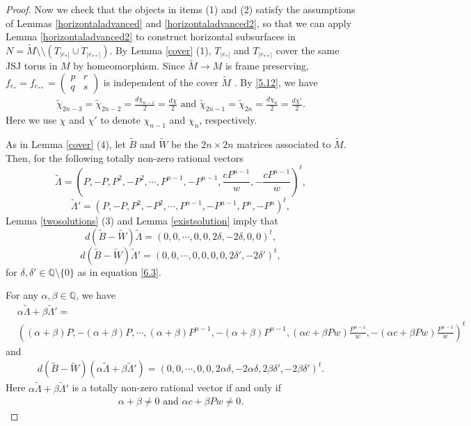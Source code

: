 \documentclass{amsart}
\numberwithin{equation}{section}
\theoremstyle{definition}
\begin{document}
\begin{proof}
Now we check that the objects in items (1) and (2) satisfy the assumptions of Lemmas \ref{horizontaladvanced} and \ref{horizontaladvanced2}, so that we can apply Lemma  \ref{horizontaladvanced2} to construct horizontal subsurfaces in $N=\tilde{M}\setminus\setminus (T_{|e_*|}\cup T_{|e_{**}|})$. By Lemma \ref{cover} (1), $T_{|e_*|}$ and $T_{|e_{**}|}$ cover the same JSJ torus in $M$ by homeomorphism. Since $\tilde{M}\to M$ is frame preserving,  $f_{e_*}=f_{e_{**}}=
\begin{pmatrix}
p & r \\
q & s
\end{pmatrix}$ is independent of the cover $\tilde{M}$ . By \eqref{5.12}, we have 
\begin{align}\label{6.14}
\tilde{\chi}_{2n-3}=\tilde{\chi}_{2n-2}=\frac{d\chi_{n-1}}{2}=\frac{d\chi}{2} \text{\ and\ } \tilde{\chi}_{2n-1}=\tilde{\chi}_{2n}=\frac{d\chi_n}{2}=\frac{d\chi'}{2}.
\end{align}
Here we use $\chi$ and $\chi'$ to denote $\chi_{n-1}$ and $\chi_n$, respectively.

As in Lemma \ref{cover} (4), let $\tilde{B}$ and $\tilde{W}$ be the $2n\times 2n$ matrices associated to $\tilde{M}$. Then, for the following totally non-zero rational vectors 
$$
\tilde{\Lambda}=(P,-P,P^2,-P^2,\cdots,P^{n-1},-P^{n-1},\frac{cP^{n-1}}{w},-\frac{cP^{n-1}}{w})^t,
$$
$$
\tilde{\Lambda}'=(P,-P,P^2,-P^2,\cdots,P^{n-1},-P^{n-1},P^n,-P^n)^t,
$$
Lemma \ref{twosolutions} (3) and Lemma \ref{existsolution} imply that 
$$d(\tilde{B}-\tilde{W})\tilde{\Lambda}=(0,0,\cdots,0,0,2\delta,-2\delta,0,0)^t,$$
$$d(\tilde{B}-\tilde{W})\tilde{\Lambda}'=(0,0,\cdots,0,0,0,0,2\delta',-2\delta')^t,$$
for $\delta,\delta'\in \mathbb{Q}\setminus \{0\}$ as in equation \eqref{6.3}.

For any $\alpha,\beta\in \mathbb{Q}$, we have
\begin{align*}
&\alpha\tilde{\Lambda}+\beta\tilde{\Lambda}'=\\
&((\alpha+\beta)P,-(\alpha+\beta)P,\cdots, (\alpha+\beta)P^{n-1},-(\alpha+\beta)P^{n-1},(\alpha c+\beta Pw)\frac{P^{n-1}}{w},-(\alpha c+\beta Pw)\frac{P^{n-1}}{w})^t
\end{align*}
and
\begin{align}\label{6.15}
d(\tilde{B}-\tilde{W})(\alpha\tilde{\Lambda}+\beta\tilde{\Lambda}')=(0,0,\cdots,0,0,2\alpha\delta,-2\alpha\delta,2\beta\delta',-2\beta\delta')^t.
\end{align}
Here $\alpha\tilde{\Lambda}+\beta\tilde{\Lambda}'$ is a totally non-zero rational vector if and only if
\begin{align}\label{6.16}
\alpha+\beta\ne 0 \text{\ and\ } \alpha c+\beta Pw\ne 0.
\end{align}


\end{proof}
\end{document}
